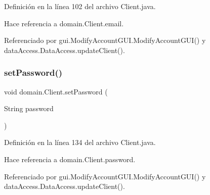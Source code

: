 Definición en la línea 102 del archivo Client.\+java.


\begin{DoxyCode}{0}

\end{DoxyCode}


Hace referencia a domain.\+Client.\+email.



Referenciado por gui.\+Modify\+Account\+G\+U\+I.\+Modify\+Account\+G\+U\+I() y data\+Access.\+Data\+Access.\+update\+Client().

\mbox{\label{classdomain_1_1_client_ae13843f725fdfd5d85a3a4176b9ee8a9}} 
\subsubsection{\texorpdfstring{setPassword()}{setPassword()}}
{\footnotesize\ttfamily void domain.\+Client.\+set\+Password (\begin{DoxyParamCaption}\item[{String}]{password }\end{DoxyParamCaption})}



Definición en la línea 134 del archivo Client.\+java.


\begin{DoxyCode}{0}

\end{DoxyCode}


Hace referencia a domain.\+Client.\+password.



Referenciado por gui.\+Modify\+Account\+G\+U\+I.\+Modify\+Account\+G\+U\+I() y data\+Access.\+Data\+Access.\+update\+Client().

